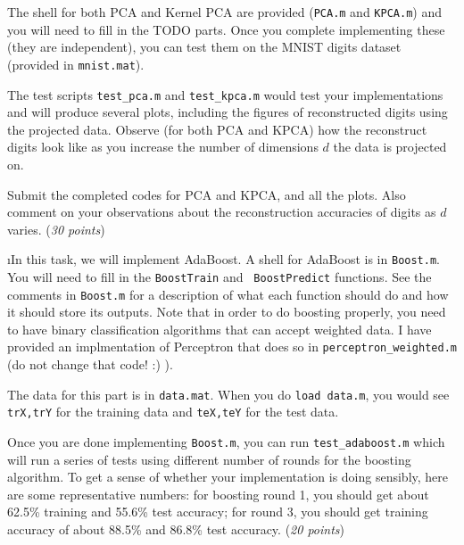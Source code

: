 \documentclass[fleqn]{article}
\begin{document}
The shell for both PCA and Kernel PCA are provided ({\tt PCA.m} and 
{\tt KPCA.m}) and you will need to fill in the TODO parts. 
Once you complete implementing these (they are independent), you can test them
on the MNIST digits dataset (provided in {\tt mnist.mat}).

The test scripts {\tt test\_pca.m} and {\tt test\_kpca.m} would test your
implementations and will produce several plots, including the figures of 
reconstructed digits using the projected data. Observe (for both
PCA and KPCA) how the reconstruct digits look like as you increase 
the number of dimensions $d$ the data is projected on.

Submit the completed codes for PCA and KPCA, and all the plots. Also comment on your
observations about the reconstruction accuracies of digits as $d$ varies.
(\emph{30 points})

\i In this task, we will implement AdaBoost.  A shell for AdaBoost is in
{\tt Boost.m}.  You will need to fill in the {\tt BoostTrain} and {\tt
  BoostPredict} functions.  See the comments in {\tt Boost.m} for a
description of what each function should do and how it should store
its outputs.  Note that in order to do boosting properly, you need to
have binary classification algorithms that can accept weighted data.
I have provided an implmentation of Perceptron that does so in
{\tt perceptron\_weighted.m} (do not change that code! :) ).

The data for this part is in {\tt data.mat}. When you do {\tt load data.m},
you would see {\tt trX,trY} for the training data and {\tt teX,teY} for
the test data.

Once you are done implementing {\tt Boost.m}, you can run {\tt test\_adaboost.m} 
which will run a series of tests using different number of rounds for the boosting 
algorithm. To get a sense of whether your implementation is doing sensibly, 
here are some representative numbers: for boosting round 1, you should get 
about 62.5\% training and 55.6\% test accuracy; for round 3, you should 
get training accuracy of about 88.5\% and 86.8\% test accuracy.
(\emph{20 points})

\ene
\end{document}

